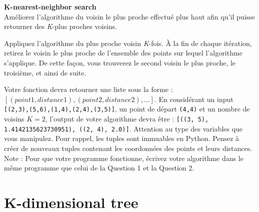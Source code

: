 \begin{Exercice}[15 minutes]\textbf{K-nearest-neighbor search}\\


Améliorez l'algorithme du voisin le plus proche effectué plus haut afin qu'il puisse retourner des \textit{K}-plus proches voisins.\\

\begin{conseil}
Appliquez l'algorithme du plus proche voisin \textit{K}-fois. À la fin de chaque itération, retirez le voisin le plus proche de l'ensemble des points sur lequel l'algorithme s'applique. De cette façon, vous trouverez le second voisin le plus proche, le troisième, et ainsi de suite. \\
\end{conseil}

\begin{conseil}
Votre fonction devra retourner une liste sous la forme : $[(point1, distance1),(point2,distance2),...]$. En considérant un input \lstinline{[(2,3),(5,6),(1,4),(2,4),(3,5)]}, un point de départ \lstinline{(4,4)} et un nombre de voisins $K=2$, l'output de votre algorithme devra être : \lstinline{[((3, 5), 1.4142135623730951), ((2, 4), 2.0)]}. Attention au type des variables que vous manipulez. Pour rappel, les tuples sont immuables en Python. Pensez à créer de nouveaux tuples contenant les coordonnées des points et leurs distances.\\

Note : Pour que votre programme fonctionne, écrivez votre algorithme dans le même programme que celui de la Question 1 et la Question 2.
\end{conseil}

%     
\begin{solution}
 
\end{solution}
\end{Exercice}

\section{K-dimensional tree}

